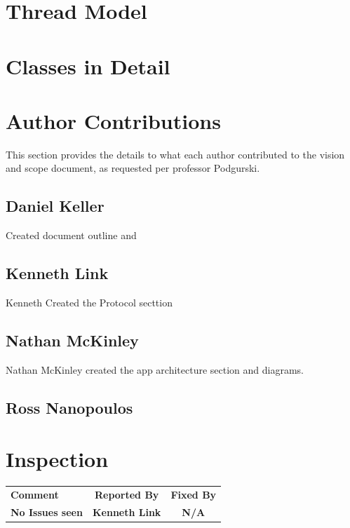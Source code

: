 \documentclass[letter]{scrartcl}
\begin{document}
\section{Thread Model}

\section{Classes in Detail}

\pagebreak
\section{Author Contributions}
This section provides the details to what each author contributed to the vision and scope document, as requested per professor Podgurski.
\subsection{Daniel Keller}
Created document outline and 
\subsection{Kenneth Link}
Kenneth Created the Protocol secttion
\subsection{Nathan McKinley}
Nathan McKinley created the app architecture section and diagrams.
\subsection{Ross Nanopoulos}


\section{Inspection}
\begin{tabularx}{\textwidth}{X c c}
\textbf{Comment} & \textbf{Reported By} & \textbf{Fixed By} \\
\textbf{No Issues seen} & \textbf{Kenneth Link} & \textbf{N/A} \\
\end{tabularx}
\end{document}
